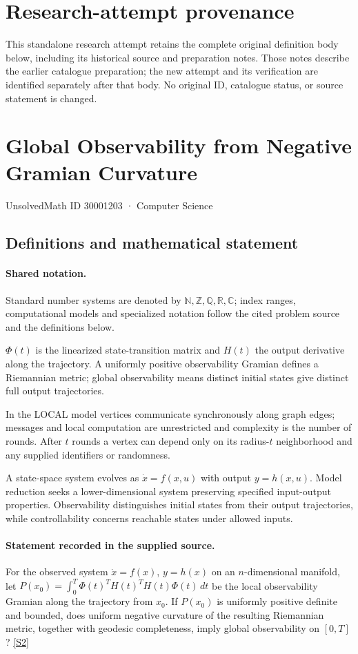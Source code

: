 \documentclass[11pt]{article}
\begin{document}
\section*{Research-attempt provenance}
This standalone research attempt retains the complete original definition body below,
including its historical source and preparation notes. Those notes describe the
earlier catalogue preparation; the new attempt and its verification are identified
separately after that body. No original ID, catalogue status, or source statement is changed.

\section{Global Observability from Negative Gramian Curvature}\label{30001203}
{\small UnsolvedMath ID 30001203 · Computer Science}
\subsection{Definitions and mathematical statement}

\paragraph{Shared notation.}Standard number systems are denoted by $\mathbb N,\mathbb Z,\mathbb Q,\mathbb R,\mathbb C$; index ranges, computational models and specialized notation follow the cited problem source and the definitions below.


$\Phi(t)$ is the linearized state-transition matrix and $H(t)$ the output derivative along the trajectory. A uniformly positive observability Gramian defines a Riemannian metric; global observability means distinct initial states give distinct full output trajectories.

In the LOCAL model vertices communicate synchronously along graph edges; messages and local computation are unrestricted and complexity is the number of rounds. After $t$ rounds a vertex can depend only on its radius-$t$ neighborhood and any supplied identifiers or randomness.

A state-space system evolves as $\dot x=f(x,u)$ with output $y=h(x,u)$. Model reduction seeks a lower-dimensional system preserving specified input-output properties. Observability distinguishes initial states from their output trajectories, while controllability concerns reachable states under allowed inputs.
\paragraph{Statement recorded in the supplied source.}
For the observed system $\dot{x}=f(x)$, $y=h(x)$ on an $n$-dimensional manifold, let $P(x_0)=\int_0^T\Phi(t)^TH(t)^TH(t)\Phi(t)\,dt$ be the local observability Gramian along the trajectory from $x_0$. If $P(x_0)$ is uniformly positive definite and bounded, does uniform negative curvature of the resulting Riemannian metric, together with geodesic completeness, imply global observability on $[0,T]$? \href{https://doi.org/10.4171/owr/2009/11}{[S2]}
\end{document}
